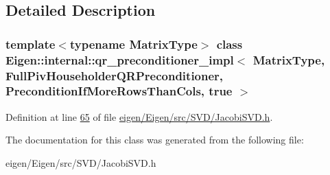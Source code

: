 \subsection{Detailed Description}
\subsubsection*{template$<$typename Matrix\+Type$>$\newline
class Eigen\+::internal\+::qr\+\_\+preconditioner\+\_\+impl$<$ Matrix\+Type, Full\+Piv\+Householder\+Q\+R\+Preconditioner, Precondition\+If\+More\+Rows\+Than\+Cols, true $>$}



Definition at line \hyperlink{eigen_2_eigen_2src_2_s_v_d_2_jacobi_s_v_d_8h_source_l00065}{65} of file \hyperlink{eigen_2_eigen_2src_2_s_v_d_2_jacobi_s_v_d_8h_source}{eigen/\+Eigen/src/\+S\+V\+D/\+Jacobi\+S\+V\+D.\+h}.



The documentation for this class was generated from the following file\+:\begin{DoxyCompactItemize}
\item 
eigen/\+Eigen/src/\+S\+V\+D/\+Jacobi\+S\+V\+D.\+h\end{DoxyCompactItemize}
